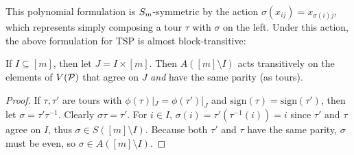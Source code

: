 This polynomial formulation is $S_{m}$-symmetric by the action $\sigma(x_{ij}) = x_{\sigma(i)j}$, which represents simply composing a tour $\tau$ with $\sigma$ on the left. Under this action, the above formulation for \textsc{TSP} is almost block-transitive:
\begin{lemma}\label{lem:tsp-blocktransitive}
If $I \subseteq [m]$, then let $J = I \times [m]$. Then $A([m] \setminus I)$ acts transitively on the elements of $V(\mathcal P)$ that agree on $J$ \emph{and} have the same parity (as tours).
\end{lemma}
\begin{proof}
If $\tau,\tau'$ are tours with $\phi(\tau)|_J = \phi(\tau')|_J$ and $\text{sign}(\tau) = \text{sign}(\tau')$, then let $\sigma = \tau'\tau^{-1}$. Clearly $\sigma\tau = \tau'$. For $i \in I$, $\sigma(i) = \tau'(\tau^{-1}(i)) = i$ since $\tau'$ and $\tau$ agree on $I$, thus $\sigma \in S([m]\setminus I)$. Because both $\tau'$ and $\tau$ have the same parity, $\sigma$ must be even, so $\sigma \in A([m]\setminus I)$.
\end{proof}

